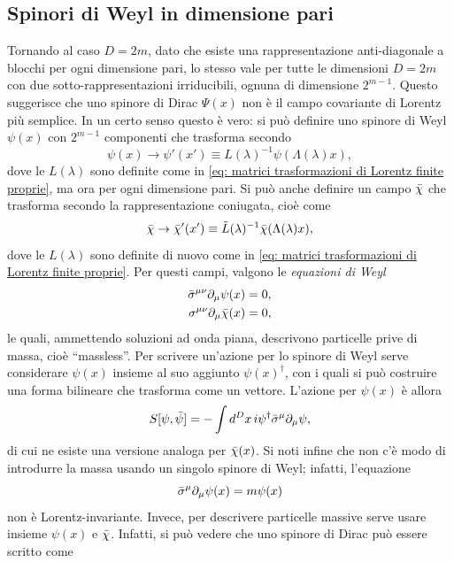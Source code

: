\subsection{Spinori di Weyl in dimensione pari}
Tornando al caso $D = 2m$, dato che esiste una rappresentazione anti-diagonale a blocchi per ogni dimensione pari, lo stesso vale per tutte le dimensioni $D = 2m$ con due sotto-rappresentazioni irriducibili, ognuna di dimensione $2^{m - 1}$. Questo suggerisce che uno spinore di Dirac $\Psi(x)$ non è il campo covariante di Lorentz più semplice. In un certo senso questo è vero: si può definire uno spinore di Weyl $\psi(x)$ con $2^{m - 1}$ componenti che trasforma secondo 
\begin{equation}
    \psi(x) \to \psi'(x') \equiv L(\lambda)^{-1}\psi(\Lambda(\lambda)x),
\end{equation}
dove le $L(\lambda)$ sono definite come in \eqref{eq: matrici trasformazioni di Lorentz finite proprie}, ma ora per ogni dimensione pari. Si può anche definire un campo $\bar{\chi}$ che trasforma secondo la rappresentazione coniugata, cioè come 
\begin{equation}
    \bar{\chi} \to \bar{\chi}'(x') \equiv \tilde{L}(\lambda)^{-1}\bar{\chi}(\Lambda(\lambda)x),
\end{equation}
dove le $L(\lambda)$ sono definite di nuovo come in \eqref{eq: matrici trasformazioni di Lorentz finite proprie}. Per questi campi, valgono le \emph{equazioni di Weyl}
\begin{align}
\label{eq: equazioni di Weyl}
    \bar{\sigma}^{\mu\nu}\partial_\mu\psi(x) &= 0, \\
    \sigma^{\mu\nu}\partial_\mu\bar{\chi}(x) &= 0,
\end{align}
le quali, ammettendo soluzioni ad onda piana, descrivono particelle prive di massa, cioè ``massless''. Per scrivere un'azione per lo spinore di Weyl serve considerare $\psi(x)$ insieme al suo aggiunto $\psi(x)^\dag$, con i quali si può costruire una forma bilineare che trasforma come un vettore. L'azione per $\psi(x)$ è allora 
\begin{equation}
    S[\psi,\bar{\psi}] = -\int d^Dx\,i\psi^\dag\bar{\sigma}^\mu\partial_\mu\psi,
\end{equation}
di cui ne esiste una versione analoga per $\bar{\chi}(x)$. Si noti infine che non c'è modo di introdurre la massa usando un singolo spinore di Weyl; infatti, l'equazione 
\begin{equation}
    \bar{\sigma}^\mu\partial_\mu\psi(x) = m\psi(x)
\end{equation}
non è Lorentz-invariante. Invece, per descrivere particelle massive serve usare insieme $\psi(x)$ e $\bar{\chi}$. Infatti, si può vedere che uno spinore di Dirac può essere scritto come 
